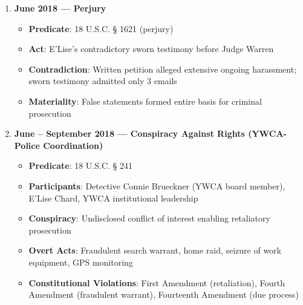 \documentclass[12pt,letterpaper]{article}
\begin{document}
\begin{enumerate}
\begin{itemize}
\item \textbf{Predicate}: 18 U.S.C. §§ 1341, 1343
\item \textbf{Act}: E'Lise Chard's protection order petition containing demonstrably false statements
\item \textbf{False Claims}: Extensive criminal drug history (I have none); threats to children; ongoing contact (admitted under oath only 3 emails)
\item \textbf{Interstate Element}: Filed in Montana based on Washington coordination
\item \textbf{Purpose}: Create basis for criminal charges in retaliation for YWCA complaint
\end{itemize}

\item \textbf{June 2018 --- Perjury}

\begin{itemize}
\item \textbf{Predicate}: 18 U.S.C. § 1621 (perjury)
\item \textbf{Act}: E'Lise's contradictory sworn testimony before Judge Warren
\item \textbf{Contradiction}: Written petition alleged extensive ongoing harassment; sworn testimony admitted only 3 emails
\item \textbf{Materiality}: False statements formed entire basis for criminal prosecution
\end{itemize}

\item \textbf{June -- September 2018 --- Conspiracy Against Rights (YWCA-Police Coordination)}

\begin{itemize}
\item \textbf{Predicate}: 18 U.S.C. § 241
\item \textbf{Participants}: Detective Connie Brueckner (YWCA board member), E'Lise Chard, YWCA institutional leadership
\item \textbf{Conspiracy}: Undisclosed conflict of interest enabling retaliatory prosecution
\item \textbf{Overt Acts}: Fraudulent search warrant, home raid, seizure of work equipment, GPS monitoring
\item \textbf{Constitutional Violations}: First Amendment (retaliation), Fourth Amendment (fraudulent warrant), Fourteenth Amendment (due process)
\end{itemize}


\end{enumerate}
\end{document}
